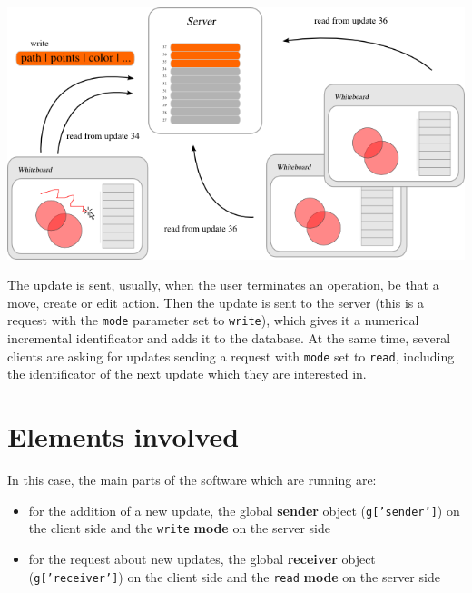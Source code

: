 \documentclass[10pt,a4paper,english]{book}
\begin{document}
\includegraphics{images/base_principle.png}

The update is sent, usually, when the user terminates an operation, be
that a move, create or edit action. Then the update is sent to the
server (this is a request with the \texttt{mode} parameter set to
\texttt{write}), which gives it a numerical incremental identificator and
adds it to the database. At the same time, several clients are asking
for updates sending a request with \texttt{mode} set to \texttt{read}, including
the identificator of the next update which they are interested in.



\hypertarget{elements-involved}{}
\section{Elements involved}
\label{elements-involved}

In this case, the main parts of the software which are running are:
\begin{itemize}
\item {} 
for the addition of a new update, the global \textbf{sender} object
(\texttt{g{[}'sender'{]}}) on the client side and the \texttt{write} \textbf{mode} on the
server side

\item {} 
for the request about new updates, the global \textbf{receiver} object
(\texttt{g{[}'receiver'{]}}) on the client side and the \texttt{read} \textbf{mode} on the
server side

\end{itemize}



\hypertarget{server-mode-parameter}{}
\end{document}
